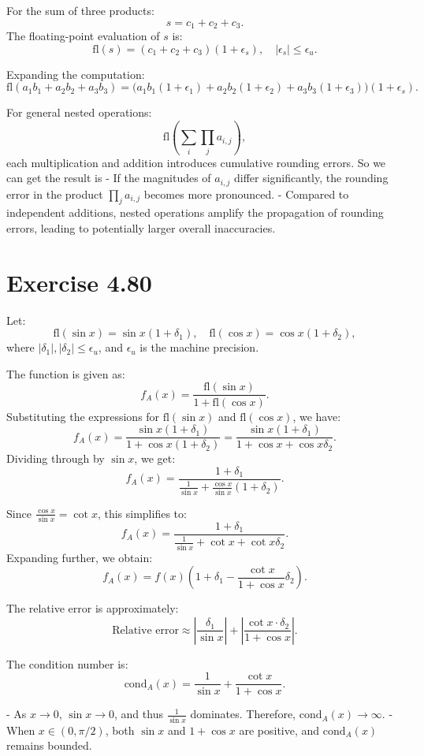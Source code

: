 \documentclass{article}
\begin{document}
For the sum of three products:
\[
s = c_1 + c_2 + c_3.
\]
The floating-point evaluation of \( s \) is:
\[
\text{fl}(s) = (c_1 + c_2 + c_3)(1 + \epsilon_s), \quad |\epsilon_s| \leq \epsilon_u.
\]

Expanding the computation:
\[
\text{fl}(a_1 b_1 + a_2 b_2 + a_3 b_3) = \big(a_1 b_1 (1 + \epsilon_1) + a_2 b_2 (1 + \epsilon_2) + a_3 b_3 (1 + \epsilon_3)\big)(1 + \epsilon_s).
\]

For general nested operations:
\[
\text{fl}\left(\sum_i \prod_j a_{i,j}\right),
\]
each multiplication and addition introduces cumulative rounding errors.
So we can get the result is
- If the magnitudes of \( a_{i,j} \) differ significantly, the rounding error in the product \( \prod_j a_{i,j} \) becomes more pronounced.
- Compared to independent additions, nested operations amplify the propagation of rounding errors, leading to potentially larger overall inaccuracies.




\section{Exercise 4.80}

Let:
\[
\text{fl}(\sin x) = \sin x (1 + \delta_1), \quad \text{fl}(\cos x) = \cos x (1 + \delta_2),
\]
where \( |\delta_1|, |\delta_2| \leq \epsilon_u \), and \( \epsilon_u \) is the machine precision.

The function is given as:
\[
f_A(x) = \frac{\text{fl}(\sin x)}{1 + \text{fl}(\cos x)}.
\]
Substituting the expressions for \(\text{fl}(\sin x)\) and \(\text{fl}(\cos x)\), we have:
\[
f_A(x) = \frac{\sin x (1 + \delta_1)}{1 + \cos x (1 + \delta_2)} = \frac{\sin x (1 + \delta_1)}{1 + \cos x + \cos x \delta_2}.
\]
Dividing through by \(\sin x\), we get:
\[
f_A(x) = \frac{1 + \delta_1}{\frac{1}{\sin x} + \frac{\cos x}{\sin x} (1 + \delta_2)}.
\]

Since \(\frac{\cos x}{\sin x} = \cot x\), this simplifies to:
\[
f_A(x) = \frac{1 + \delta_1}{\frac{1}{\sin x} + \cot x + \cot x \delta_2}.
\]
Expanding further, we obtain:
\[
f_A(x) = f(x) \left(1 + \delta_1 - \frac{\cot x}{1 + \cos x} \delta_2\right).
\]

The relative error is approximately:
\[
\text{Relative error} \approx \left| \frac{\delta_1}{\sin x} \right| + \left| \frac{\cot x \cdot \delta_2}{1 + \cos x} \right|.
\]

The condition number is:
\[
\text{cond}_A(x) = \frac{1}{\sin x} + \frac{\cot x}{1 + \cos x}.
\]

- As \( x \to 0 \), \(\sin x \to 0\), and thus \(\frac{1}{\sin x}\) dominates. Therefore, \(\text{cond}_A(x) \to \infty\).
- When \( x \in (0, \pi/2) \), both \(\sin x\) and \(1 + \cos x\) are positive, and \(\text{cond}_A(x)\) remains bounded.
\end{document}

